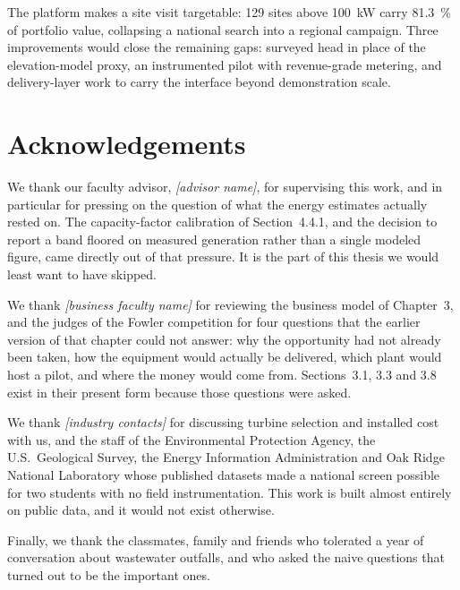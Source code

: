 \documentclass[12pt,letterpaper]{report}
\begin{document}
The platform makes a site visit targetable: 129 sites above 100~kW carry 81.3~\% of
portfolio value, collapsing a national search into a regional campaign. Three
improvements would close the remaining gaps: surveyed head in place of the
elevation-model proxy, an instrumented pilot with revenue-grade metering, and
delivery-layer work to carry the interface beyond demonstration scale.

\chapter*{Acknowledgements}
\newcommand{\ackname}[1]{\textit{[#1]}}

We thank our faculty advisor, \ackname{advisor name}, for supervising this work, and in
particular for pressing on the question of what the energy estimates actually rested on.
The capacity-factor calibration of Section~4.4.1, and the decision to report a band
floored on measured generation rather than a single modeled figure, came directly out of
that pressure. It is the part of this thesis we would least want to have skipped.

We thank \ackname{business faculty name} for reviewing the business model of Chapter~3,
and the judges of the Fowler competition for four questions that the earlier version of
that chapter could not answer: why the opportunity had not already been taken, how the
equipment would actually be delivered, which plant would host a pilot, and where the
money would come from. Sections~3.1, 3.3 and 3.8 exist in their present form because
those questions were asked.

We thank \ackname{industry contacts} for discussing turbine selection and installed cost
with us, and the staff of the Environmental Protection Agency, the U.S.\ Geological
Survey, the Energy Information Administration and Oak Ridge National Laboratory whose
published datasets made a national screen possible for two students with no field
instrumentation. This work is built almost entirely on public data, and it would not
exist otherwise.

Finally, we thank the classmates, family and friends who tolerated a year of
conversation about wastewater outfalls, and who asked the naive questions that turned
out to be the important ones.
\end{document}
